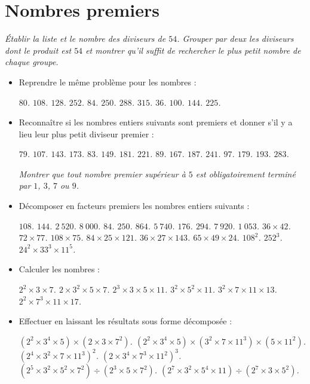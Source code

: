\chapter{Nombres premiers}
 \begin{itemize}
 \it Établir la liste et le nombre des diviseurs de $54$. Grouper par deux les diviseurs dont le produit est $54$ et montrer qu'il suffit de rechercher le plus petit nombre de chaque groupe. \end{itemize}
 \begin{itemize}
 \item Reprendre le même problème pour les nombres :  \begin{itemize}
 \it $80$.
 \it $108$.
 \it $128$. 
 \it $252$. 
 \it $84$. 
 \it $250$.
 \it $288$. 
 \it $315$. 
 \it $36$. 
 \it $100$.
 \it $144$. 
 \it $225$.
 \end{itemize}
 \item Reconnaître si les nombres entiers suivants sont premiers et donner s'il y a lieu leur plus petit diviseur premier : \begin{itemize}
 \it $79$. 
 \it $107$. 
 \it $143$. 
 \it $173$. 
 \it $83$. 
 \it $149$. 
 \it $181$. 
 \it $221$. 
 \it $89$. 
 \it $167$. 
 \it $187$. 
 \it $241$. 
 \it $97$. 
 \it $179$. 
 \it $193$. 
 \it $283$. 
 \end{itemize}
 \it Montrer que tout nombre premier supérieur à $5$ est obligatoirement terminé par $1$, $3$, $7$ ou $9$. 
 \item Décomposer en facteurs premiers les nombres entiers suivants : 
 \begin{itemize}
 \it $108$. 
 \it $144$. 
 \it $2~520$. 
 \it $8~000$. 
 \it $84$. 
 \it $250$. 
 \it $864$. 
 \it $5~740$. 
 \it $176$.
 \it $294$. 
 \it $7~920$. 
 \it $1~053$. 
 \it $36\times 42$. 
 \it $72\times 77$. 
 \it $108\times 75$. 
 \it $84\times 25\times 121$.
 \it $36\times 27\times 143$. 
 \it $65\times 49\times 24$. 
 \it $108^2$. 
 \it $252^3$. 
 \it $24^2\times 33^3 \times 11^5$. 
 \end{itemize}
 \item Calculer les nombres : 
 \begin{itemize}
 \it $2^2\times 3\times 7$.
 \it $2\times 3^2\times 5\times 7$.
 \it $2^3\times 3\times 5\times 11$.
 \it $3^2\times 5^2\times 11$. 
 \it $3^2\times 7\times 11\times 13$. 
 \it $2^2\times 7^3\times 11\times 17$.
 \end{itemize}
 \item Effectuer en laissant les résultats sous forme
 décomposée : 
 \begin{itemize}
 \it $(2^2\times3^4\times 5)\times(2\times3\times 7^2)$. 
 \it $(2^2\times 3^4\times 5) \times (3^2\times 7
 \times11^3)\times(5\times 11^2)$. 
 \it $(2^4\times 3^2\times 7\times 11^3)^2$. 
 \it $(2\times 3^4\times 7^3\times 11^2)^3$. 
 \it $(2^5\times 3^2\times 5^2\times 7^2)\div (2^3\times 5\times 7^2)$.
 \it $(2^7\times 3^2\times 5^4\times 11) \div (2^7\times 3\times 5^2)$.
 \end{itemize}
 \end{itemize}